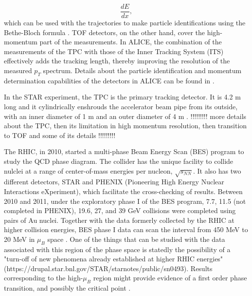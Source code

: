 \begin{equation}\label{eqn:specificEnLoss}
	\frac{dE}{dx} ,
\end{equation}
which can be used with the trajectories to make particle identifications using the Bethe-Bloch formula \cite{bethe1953passage}. TOF detectors, on the other hand, cover the high-momentum part of the measurements. In ALICE, the combination of the measurements of the TPC with those of the Inner Tracking System (ITS) effectively adds the tracking length, thereby improving the resolution of the measured $p_{T}$ spectrum. Details about the particle identification and momentum determination capabilities of the detectors in ALICE can be found in \cite{1748-0221-3-08-S08002}.

In the STAR experiment, the TPC is the primary tracking detector. It is 4.2 m long and it cylindrically enshrouds the accelerator beam pipe from its outside, with an inner diameter of 1 m and an outer diameter of 4 m \cite{phdthesisnattrass}. !!!!!!!!! more details about the TPC, then its limitation in high momentum resolution, then transition to TOF and some of its details !!!!!!!!!


The RHIC, in 2010, started a multi-phase Beam Energy Scan (BES) program to study the QCD phase diagram. The collider has the unique facility to collide nulclei at a range of center-of-mass energies per nucleon, $\sqrt{s_{NN}}$. It also has two different detectors, STAR and PHENIX (Pioneering High Energy Nuclear Interactions eXperiment), which facilitate the cross-checking of results. Between 2010 and 2011, under the exploratory phase I of the BES program, 7.7, 11.5 (not completed in PHENIX), 19.6, 27, and 39 GeV collisions were completed using pairs of Au nuclei. Together with the data formerly collected by the RHIC at higher collision energies, BES phase I data can scan the interval from 450 MeV to 20 MeV in $\mu_{B}$ space \cite{1742-6596-455-1-012037, LUO201675}. One of the things that can be studied with the data associated with this region of the phase space is statedly the possibility of a "turn-off of new phenomena already established at higher RHIC energies" (https://drupal.star.bnl.gov/STAR/starnotes/public/sn0493). Results corresponding to the high-$\mu_{B}$ region might provide evidence of a first order phase transition, and possibly the critical point \cite{LUO201675}.

